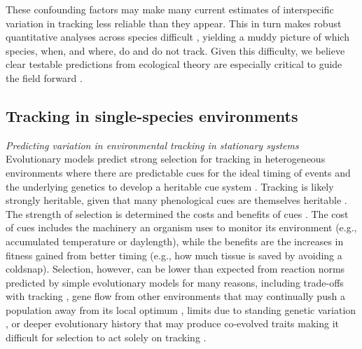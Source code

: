 \documentclass[11pt,letterpaper]{article}
\newcommand{\R}[1]{\label{#1}\linelabel{#1}}
\begin{document}
These confounding factors may make many current estimates of interspecific variation in tracking less reliable than they appear. This in turn makes robust quantitative analyses across species difficult \citep{brown2016,kharouba2018}, yielding a muddy picture of which species, when, and where, do and do not track. Given this difficulty, we believe clear testable predictions from ecological theory are especially critical to guide the field forward \citep{Smaldino2016}.  

\subsection{Tracking in single-species environments}

\emph{Predicting variation in environmental tracking in stationary systems}\\ 
Evolutionary models predict strong selection for tracking in heterogeneous environments where there are predictable cues for the ideal timing of events and the underlying genetics to develop a heritable cue system \citep{Piersma:2003wj,reed2010}. Tracking is likely strongly heritable, given that many phenological cues are themselves heritable \citep[e.g.,][]{vanAsch2007gcb,Wilczek:2010ad}. The strength of selection is determined the costs and benefits of cues \citep{donahue2015}. The cost of cues includes the machinery an organism uses to monitor its environment (e.g., accumulated temperature or daylength), while the benefits are the increases in fitness gained from better timing (e.g., how much tissue is saved by avoiding a coldsnap).  \R{r1consS}Selection, however, can be lower than expected from reaction norms predicted by simple evolutionary models for many reasons, including trade-offs with tracking \citep{Singer:2010eb,Johansson2012}, gene flow from other environments that may continually push a population away from its local optimum \citep{lenormand2002}, limits due to standing genetic variation  \citep{Franks:2007wd,ghalambor2015}, or deeper evolutionary history that may produce co-evolved traits making it difficult for selection to act solely on tracking \citep{Ackerly:2009ly}.\R{r1consE} 
\end{document}

